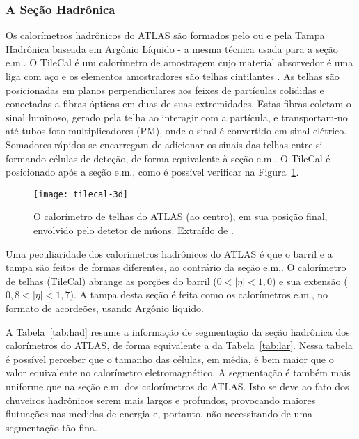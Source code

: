 \subsubsection{A Seção Hadrônica}

Os calorímetros hadrônicos do ATLAS são formados pelo  ou  e pela Tampa Hadrônica baseada em Argônio Líquido
- a mesma técnica usada para a seção e.m.. O TileCal é um calorímetro de
amostragem cujo material absorvedor é uma liga com aço e os elementos
amostradores são telhas cintilantes \cite{tilecal}. As telhas são posicionadas
em planos perpendiculares aos feixes de partículas colididas e conectadas a
fibras ópticas em duas de suas extremidades. Estas fibras coletam o sinal
luminoso, gerado pela telha ao interagir com a partícula, e transportam-no até
tubos foto-multiplicadores (PM), onde o sinal
é convertido em sinal elétrico. Somadores rápidos \cite{seixas:adder} se
encarregam de adicionar os sinais das telhas entre si formando células de
deteção, de forma equivalente à seção e.m.. O TileCal é posicionado após a
seção e.m., como é possível verificar na Figura~\ref{fig:tile-pos}.

\begin{figure}
\begin{center}
\texttt{[image: tilecal-3d]}
\end{center}
\caption{O calorímetro de telhas do ATLAS (ao centro), em sua posição
final, envolvido pelo detetor de múons. Extraído de \cite{cern}.}
\label{fig:tile-pos}
\end{figure}

Uma peculiaridade dos calorímetros hadrônicos do ATLAS é que o barril e a
tampa são feitos de formas diferentes, ao contrário da seção e.m.. O
calorímetro de telhas (TileCal) abrange as porções do barril ($0<|\eta|<1,0$)
e sua extensão ($0,8<|\eta|<1,7$). A tampa desta seção é feita como os
calorímetros e.m., no formato de acordeões, usando Argônio líquido.

A Tabela~\ref{tab:had} resume a informação de segmentação da seção hadrônica
dos calorímetros do ATLAS, de forma equivalente a da Tabela~\ref{tab:lar}.
Nessa tabela é possível perceber que o tamanho das células, em média, é bem
maior que o valor equivalente no calorímetro eletromagnético. A segmentação
é também mais uniforme que na seção e.m. dos calorímetros do ATLAS. Isto se
deve ao fato dos chuveiros hadrônicos serem mais largos e profundos,
provocando maiores flutuações nas medidas de energia e, portanto, não
necessitando de uma segmentação tão fina.

